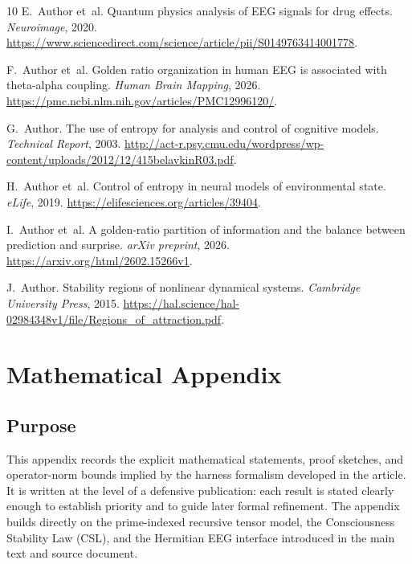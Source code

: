 \documentclass[11pt]{article}
\begin{document}
\begin{thebibliography}{10}
E.~Author et~al.
\newblock Quantum physics analysis of EEG signals for drug effects.
\newblock \emph{Neuroimage}, 2020. \url{https://www.sciencedirect.com/science/article/pii/S0149763414001778}.

F.~Author et~al.
\newblock Golden ratio organization in human EEG is associated with theta-alpha coupling.
\newblock \emph{Human Brain Mapping}, 2026. \url{https://pmc.ncbi.nlm.nih.gov/articles/PMC12996120/}.

G.~Author.
\newblock The use of entropy for analysis and control of cognitive models.
\newblock \emph{Technical Report}, 2003. \url{http://act-r.psy.cmu.edu/wordpress/wp-content/uploads/2012/12/415belavkinR03.pdf}.

H.~Author et~al.
\newblock Control of entropy in neural models of environmental state.
\newblock \emph{eLife}, 2019. \url{https://elifesciences.org/articles/39404}.

I.~Author et~al.
\newblock A golden-ratio partition of information and the balance between prediction and surprise.
\newblock \emph{arXiv preprint}, 2026. \url{https://arxiv.org/html/2602.15266v1}.

J.~Author.
\newblock Stability regions of nonlinear dynamical systems.
\newblock \emph{Cambridge University Press}, 2015. \url{https://hal.science/hal-02984348v1/file/Regions_of_attraction.pdf}.

\end{thebibliography}

\section*{Mathematical Appendix}

\subsection*{Purpose}

This appendix records the explicit mathematical statements, proof sketches, and operator-norm bounds implied by the harness formalism developed in the article. It is written at the level of a defensive publication: each result is stated clearly enough to establish priority and to guide later formal refinement. The appendix builds directly on the prime-indexed recursive tensor model, the Consciousness Stability Law (CSL), and the Hermitian EEG interface introduced in the main text and source document. \cite{neuroplasticityMT,EntropyCognitiveModels,EntropyNeuralControl,QuantumEEG1,GoldenEEG}
\end{document}
